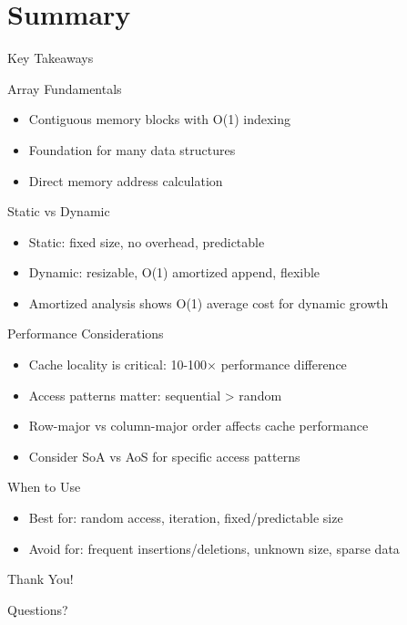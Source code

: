 \documentclass[aspectratio=169,xcolor=dvipsnames]{beamer}
\begin{document}
\section{Summary}

\begin{frame}{Key Takeaways}
  \begin{block}{Array Fundamentals}
    \begin{itemize}
      \item Contiguous memory blocks with O(1) indexing
      \item Foundation for many data structures
      \item Direct memory address calculation
    \end{itemize}
  \end{block}

  \begin{block}{Static vs Dynamic}
    \begin{itemize}
      \item Static: fixed size, no overhead, predictable
      \item Dynamic: resizable, O(1) amortized append, flexible
      \item Amortized analysis shows O(1) average cost for dynamic growth
    \end{itemize}
  \end{block}

  \begin{block}{Performance Considerations}
    \begin{itemize}
      \item Cache locality is critical: 10-100× performance difference
      \item Access patterns matter: sequential > random
      \item Row-major vs column-major order affects cache performance
      \item Consider SoA vs AoS for specific access patterns
    \end{itemize}
  \end{block}

  \begin{block}{When to Use}
    \begin{itemize}
      \item Best for: random access, iteration, fixed/predictable size
      \item Avoid for: frequent insertions/deletions, unknown size, sparse data
    \end{itemize}
  \end{block}
\end{frame}

\begin{frame}[plain]
  \begin{center}
    {\Huge Thank You!}

    \vspace{1cm}

    {\large Questions?}
  \end{center}
\end{frame}
\end{document}
